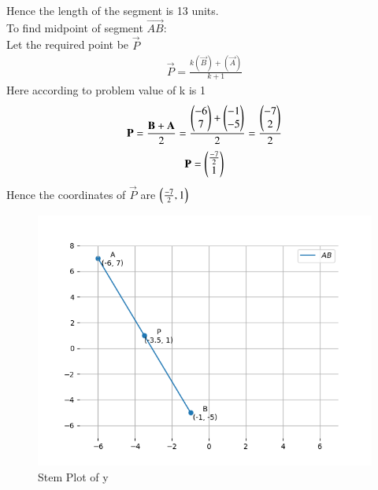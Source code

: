 \documentclass[journal]{IEEEtran}
\begin{document}
Hence the length of the segment is 13 units. \\
To find midpoint of segment  $\vec{AB}$: \\
Let the required point be $\vec{P}$
\begin{align}
\vec{P}=\frac{k(\vec{B})+(\vec{A})}{k+1}
\end{align}
Here according to problem value of k is 1\\
\begin{align}
\mathbf{P}=\frac{\mathbf{B}+\mathbf{A}}{2}=\frac{\begin{pmatrix}-6\\7\end{pmatrix}+\begin{pmatrix}-1\\-5\end{pmatrix}}{2}=\frac{\begin{pmatrix}-7\\2\end{pmatrix}}{2}\\
\end{align}
\begin{align}
\mathbf{P}=\begin{pmatrix}\frac{-7}{2}\\1\end{pmatrix}
\end{align}
Hence the coordinates of $\vec{P}$ are $\left(\frac{-7}{2},1\right)$
\begin{figure}[h!]
   \centering
   \includegraphics[width=0.7\columnwidth]{figs/fig1.png}
   \caption{Stem Plot of y}
   \label{stemplot}
\end{figure}
\end{document}
